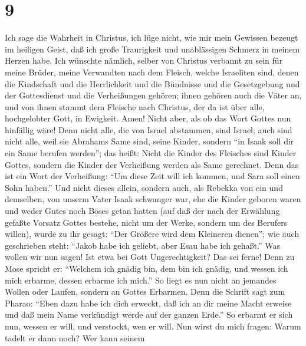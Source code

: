 \hypertarget{section-8}{%
\section{9}\label{section-8}}

 Ich sage die Wahrheit in Christus, ich lüge nicht, wie
mir mein Gewissen bezeugt im heiligen Geist,  daß ich
große Traurigkeit und unablässigen Schmerz in meinem Herzen habe.
 Ich wünschte nämlich, selber von Christus verbannt zu
sein für meine Brüder, meine Verwandten nach dem Fleisch, 
welche Israeliten sind, denen die Kindschaft und die Herrlichkeit und
die Bündnisse und die Gesetzgebung und der Gottesdienst und die
Verheißungen gehören;  ihnen gehören auch die Väter an,
und von ihnen stammt dem Fleische nach Christus, der da ist über alle,
hochgelobter Gott, in Ewigkeit. Amen!  Nicht aber, als ob
das Wort Gottes nun hinfällig wäre! Denn nicht alle, die von Israel
abstammen, sind Israel;  auch sind nicht alle, weil sie
Abrahams Same sind, seine Kinder, sondern ``in Isaak soll dir ein Same
berufen werden'';  das heißt: Nicht die Kinder des
Fleisches sind Kinder Gottes, sondern die Kinder der Verheißung werden
als Same gerechnet.  Denn das ist ein Wort der Verheißung:
``Um diese Zeit will ich kommen, und Sara soll einen Sohn haben.''
 Und nicht dieses allein, sondern auch, als Rebekka von
ein und demselben, von unserm Vater Isaak schwanger war, 
ehe die Kinder geboren waren und weder Gutes noch Böses getan hatten
(auf daß der nach der Erwählung gefaßte Vorsatz Gottes bestehe, nicht um
der Werke, sondern um des Berufers willen),  wurde zu ihr
gesagt: ``Der Größere wird dem Kleineren dienen'';  wie
auch geschrieben steht: ``Jakob habe ich geliebt, aber Esau habe ich
gehaßt.''  Was wollen wir nun sagen! Ist etwa bei Gott
Ungerechtigkeit? Das sei ferne!  Denn zu Mose spricht er:
``Welchem ich gnädig bin, dem bin ich gnädig, und wessen ich mich
erbarme, dessen erbarme ich mich.''  So liegt es nun
nicht an jemandes Wollen oder Laufen, sondern an Gottes Erbarmen.
 Denn die Schrift sagt zum Pharao: ``Eben dazu habe ich
dich erweckt, daß ich an dir meine Macht erweise und daß mein Name
verkündigt werde auf der ganzen Erde.''  So erbarmt er
sich nun, wessen er will, und verstockt, wen er will. 
Nun wirst du mich fragen: Warum tadelt er dann noch? Wer kann seinem
